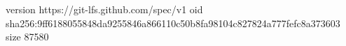 version https://git-lfs.github.com/spec/v1
oid sha256:9ff6188055848da9255846a866110c50b8fa98104c827824a777fefc8a373603
size 87580
